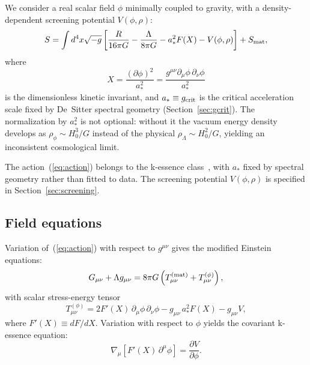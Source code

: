 \documentclass[11pt,a4paper]{article}
\begin{document}
We consider a real scalar field $\phi$ minimally coupled to gravity, with a
density-dependent screening potential $V(\phi,\rho)$:
\begin{equation}
  S = \int d^4x\sqrt{-g}\left[\frac{R}{16\pi G} - \frac{\Lambda}{8\pi G}
  - a_*^2 F(X) - V(\phi,\rho)\right] + S_{\rm mat},
  \label{eq:action}
\end{equation}
where
\begin{equation}
  X = \frac{(\partial\phi)^2}{a_*^2} = \frac{g^{\mu\nu}\partial_\mu\phi\,\partial_\nu\phi}{a_*^2}
\end{equation}
is the dimensionless kinetic invariant, and $a_* \equiv g_{\rm crit}$ is the critical
acceleration scale fixed by De~Sitter spectral geometry (Section~\ref{sec:gcrit}).
The normalization by $a_*^2$ is not optional: without it the vacuum energy density
develops as $\rho_\phi\sim H_0^3/G$ instead of the physical $\rho_\Lambda\sim H_0^2/G$,
yielding an inconsistent cosmological limit.

The action~(\ref{eq:action}) belongs to the k-essence class~\cite{ArmendarizPicon1999},
with $a_*$ fixed by spectral geometry rather than fitted to data. The screening potential
$V(\phi,\rho)$ is specified in Section~\ref{sec:screening}.

\subsection{Field equations}
\label{subsec:fieldeqs}

Variation of~(\ref{eq:action}) with respect to $g^{\mu\nu}$ gives the modified Einstein
equations:
\begin{equation}
  G_{\mu\nu} + \Lambda g_{\mu\nu}
  = 8\pi G\left(T_{\mu\nu}^{(\rm mat)} + T_{\mu\nu}^{(\phi)}\right),
  \label{eq:einstein}
\end{equation}
with scalar stress-energy tensor
\begin{equation}
  T_{\mu\nu}^{(\phi)}
  = 2F'(X)\,\partial_\mu\phi\,\partial_\nu\phi
  - g_{\mu\nu}\,a_*^2 F(X)
  - g_{\mu\nu} V,
  \label{eq:Tphi}
\end{equation}
where $F'(X)\equiv dF/dX$. Variation with respect to $\phi$ yields the covariant
k-essence equation:
\begin{equation}
  \nabla_\mu\!\left[F'(X)\,\partial^\mu\phi\right] = \frac{\partial V}{\partial\phi}.
  \label{eq:kessence}
\end{equation}
\end{document}
